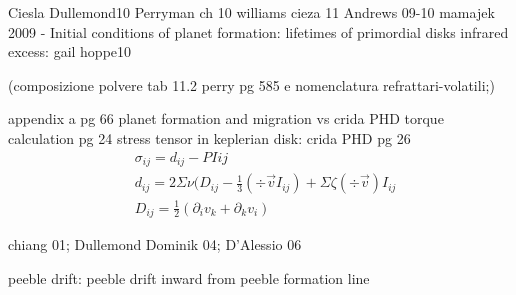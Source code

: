 \begin{workout}
	Ciesla Dullemond10 
	Perryman ch 10
	williams cieza 11
	Andrews 09-10
	mamajek 2009 - Initial conditions of planet formation: lifetimes of primordial disks
	infrared excess: gail hoppe10
\end{workout}


\begin{workout}
	(composizione polvere tab 11.2 perry pg 585 e nomenclatura refrattari-volatili;)
\end{workout}

\begin{workout}
	
\end{workout}


\begin{workout}
	appendix a pg 66 planet formation and migration vs crida PHD torque calculation pg 24
	stress tensor in keplerian disk: crida PHD
	pg 26
	\begin{align}
		&\sigma_{ij}=d_{ij}-PI{ij}\\
		&d_{ij}=2\Sigma\nu(D_{ij}-\frac{1}{3}(\div{\vec{v}}I_{ij})+\Sigma\zeta(\div{\vec{v}})I_{ij}\\
		&D_{ij}=\frac{1}{2}(\partial_iv_k+\partial_kv_i)
	\end{align}
\end{workout}

\begin{workout}
	chiang 01; Dullemond Dominik 04; D'Alessio 06
\end{workout}

\begin{workout}
peeble drift: peeble drift inward from peeble formation line 
\end{workout}

